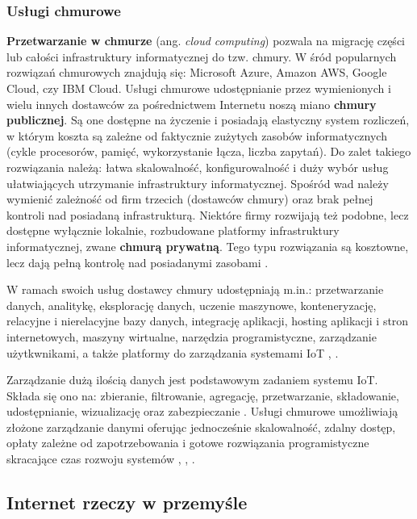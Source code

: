 \documentclass[a4paper, 12pt, twoside]{article}
\begin{document}
\subsubsection{Usługi chmurowe}

\textbf{Przetwarzanie w chmurze} (ang. \emph{cloud computing}) pozwala 
na migrację części lub całości infrastruktury informatycznej do tzw. chmury.
W śród popularnych rozwiązań chmurowych znajdują się: 
Microsoft Azure, Amazon AWS, Google Cloud, czy IBM Cloud. Usługi chmurowe
udostępnianie przez wymienionych i wielu innych dostawców za pośrednictwem Internetu 
noszą miano \textbf{chmury publicznej}. 
Są one dostępne na życzenie i posiadają elastyczny
system rozliczeń, w którym koszta są zależne od faktycznie zużytych zasobów informatycznych
(cykle procesorów, pamięć, wykorzystanie łącza, liczba zapytań). Do zalet takiego
rozwiązania należą: łatwa skalowalność, konfigurowalność i duży wybór usług
ułatwiających utrzymanie infrastruktury informatycznej. Spośród wad należy wymienić
zależność od firm trzecich (dostawców chmury) oraz brak pełnej kontroli nad 
posiadaną infrastrukturą. Niektóre firmy rozwijają też podobne, lecz dostępne 
wyłącznie lokalnie, rozbudowane platformy infrastruktury informatycznej, zwane \textbf{chmurą prywatną}.
Tego typu rozwiązania są kosztowne, lecz dają pełną kontrolę nad posiadanymi zasobami \cite{iot-hype-to-reality}.

W ramach swoich usług dostawcy chmury udostępniają m.in.: przetwarzanie danych, 
analitykę, eksplorację danych, uczenie maszynowe, konteneryzację, relacyjne i nierelacyjne
bazy danych, integrację aplikacji, hosting aplikacji i stron internetowych, 
maszyny wirtualne, narzędzia programistyczne, zarządzanie użytkwnikami, a także
platformy do zarządzania systemami IoT \cite{aws}, \cite{azure}.

Zarządzanie dużą ilością danych jest podstawowym zadaniem systemu IoT. Składa się ono
na: zbieranie, filtrowanie, agregację, przetwarzanie, składowanie, udostępnianie,
wizualizację oraz zabezpieczanie \cite{intro-to-iot}. Usługi chmurowe umożliwiają złożone zarządzanie
danymi oferując jednocześnie skalowalność, zdalny dostęp, opłaty zależne od zapotrzebowania
i gotowe rozwiązania programistyczne skracające czas rozwoju systemów
\cite{measuring-value-of-cloud-computing}, \cite{iot-and-cloud}, \cite{iot-in-industrial-sector}. 

\subsection{Internet rzeczy w przemyśle}\label{iiot}
\end{document}
